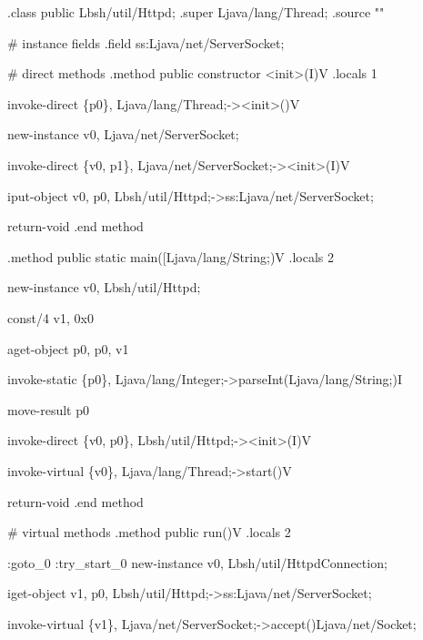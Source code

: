 \documentclass[
]{article}
\newenvironment{Shaded}{}{}
\newcommand{\NormalTok}[1]{#1}
\begin{document}
\begin{Shaded}
\begin{Highlighting}[]
\NormalTok{.class public Lbsh/util/Httpd;}
\NormalTok{.super Ljava/lang/Thread;}
\NormalTok{.source ""}


\NormalTok{\# instance fields}
\NormalTok{.field ss:Ljava/net/ServerSocket;}


\NormalTok{\# direct methods}
\NormalTok{.method public constructor \textless{}init\textgreater{}(I)V}
\NormalTok{    .locals 1}

\NormalTok{    invoke{-}direct \{p0\}, Ljava/lang/Thread;{-}\textgreater{}\textless{}init\textgreater{}()V}

\NormalTok{    new{-}instance v0, Ljava/net/ServerSocket;}

\NormalTok{    invoke{-}direct \{v0, p1\}, Ljava/net/ServerSocket;{-}\textgreater{}\textless{}init\textgreater{}(I)V}

\NormalTok{    iput{-}object v0, p0, Lbsh/util/Httpd;{-}\textgreater{}ss:Ljava/net/ServerSocket;}

\NormalTok{    return{-}void}
\NormalTok{.end method}

\NormalTok{.method public static main([Ljava/lang/String;)V}
\NormalTok{    .locals 2}

\NormalTok{    new{-}instance v0, Lbsh/util/Httpd;}

\NormalTok{    const/4 v1, 0x0}

\NormalTok{    aget{-}object p0, p0, v1}

\NormalTok{    invoke{-}static \{p0\}, Ljava/lang/Integer;{-}\textgreater{}parseInt(Ljava/lang/String;)I}

\NormalTok{    move{-}result p0}

\NormalTok{    invoke{-}direct \{v0, p0\}, Lbsh/util/Httpd;{-}\textgreater{}\textless{}init\textgreater{}(I)V}

\NormalTok{    invoke{-}virtual \{v0\}, Ljava/lang/Thread;{-}\textgreater{}start()V}

\NormalTok{    return{-}void}
\NormalTok{.end method}


\NormalTok{\# virtual methods}
\NormalTok{.method public run()V}
\NormalTok{    .locals 2}

\NormalTok{    :goto\_0}
\NormalTok{    :try\_start\_0}
\NormalTok{    new{-}instance v0, Lbsh/util/HttpdConnection;}

\NormalTok{    iget{-}object v1, p0, Lbsh/util/Httpd;{-}\textgreater{}ss:Ljava/net/ServerSocket;}

\NormalTok{    invoke{-}virtual \{v1\}, Ljava/net/ServerSocket;{-}\textgreater{}accept()Ljava/net/Socket;}


\end{Highlighting}
\end{Shaded}
\end{document}
